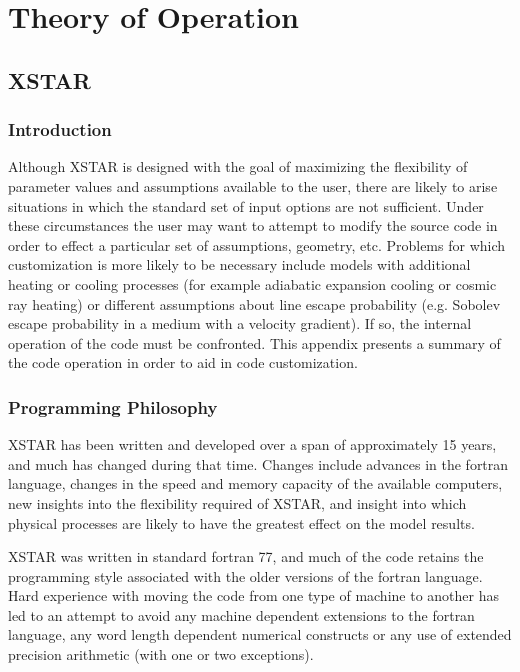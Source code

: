 \chapter{Theory of Operation}
\label{sec:internals}

\section{XSTAR}

\subsection{Introduction}

Although XSTAR is designed with the goal of maximizing the flexibility 
of parameter values and assumptions available to the user, there are 
likely to arise situations in which the standard set of input options are 
not sufficient.  Under these circumstances the user may want to attempt to 
modify the source code in order to effect a particular set of assumptions, 
geometry, etc.  
Problems for which customization is more likely to be necessary include 
models with additional heating or cooling processes (for example  adiabatic 
expansion cooling or cosmic ray heating) or different assumptions about line 
escape probability (e.g. Sobolev escape probability in a medium with a 
velocity gradient).  If so, the internal operation of the code must be 
confronted.  This appendix presents a summary of the code 
operation in order to aid in code customization.  

\subsection {Programming Philosophy}

XSTAR has been written and developed over a span of approximately 15 years, 
and much has changed during that time.  Changes include advances in the 
fortran language, changes in the speed and memory capacity of the available 
computers, new insights into the flexibility required of XSTAR, and insight 
into which physical processes are likely to have the greatest effect on the 
model results.  

XSTAR was written in standard fortran 77, and much of the 
code retains the programming style associated with the older versions 
of the fortran language.  Hard experience with moving the code from 
one type of machine to another has led to an attempt to avoid any machine 
dependent extensions to the fortran language, any word length dependent 
numerical constructs or any use of extended precision arithmetic 
(with one or two exceptions).

